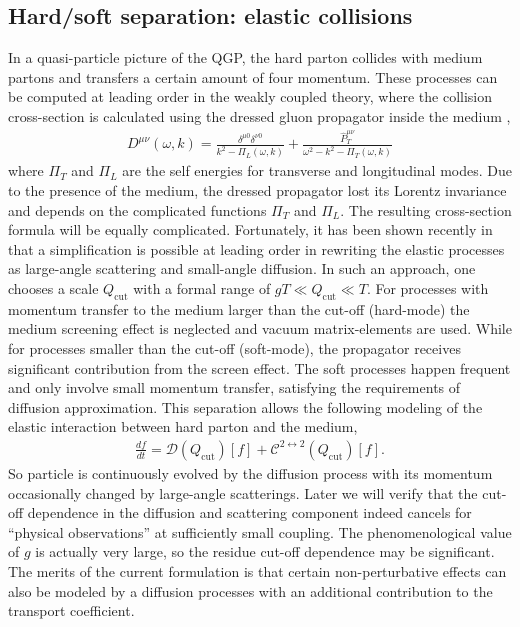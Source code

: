 \subsection{Hard/soft separation: elastic collisions}
In a quasi-particle picture of the QGP, the hard parton collides with medium partons and transfers a certain amount of four momentum.
These processes can be computed at leading order in the weakly coupled theory, where the collision cross-section is calculated using the dressed gluon propagator inside the medium \cite{PhysRevD.44.1298},
\begin{eqnarray}
D^{\mu\nu}(\omega, k) = \frac{\delta^{\mu 0}\delta^{\nu 0}}{k^2 - \Pi_L(\omega, k)} + \frac{\hat{P}_T^{\mu\nu}}{\omega^2 - k^2 - \Pi_T(\omega, k)}
\end{eqnarray}
where $\Pi_T$ and $\Pi_L$ are the self energies for transverse and longitudinal modes.
Due to the presence of the medium, the dressed propagator lost its Lorentz invariance and depends on the complicated functions $\Pi_T$ and $\Pi_L$.
The resulting cross-section formula will be equally complicated.
Fortunately, it has been shown recently in \cite{Ghiglieri:2015ala} that a simplification is possible at leading order in rewriting the elastic processes as large-angle scattering and small-angle diffusion.
In such an approach, one chooses a scale $Q_\textrm{cut}$ with a formal range of $gT \ll Q_\textrm{cut} \ll T$.
For processes with momentum transfer to the medium larger than the cut-off  (hard-mode) the medium screening effect is neglected and vacuum matrix-elements are used.
While for processes smaller than the cut-off (soft-mode), the propagator receives significant contribution from the screen effect.
The soft processes happen frequent and only involve small momentum transfer, satisfying the requirements of diffusion approximation.
This separation allows the following modeling of the elastic interaction between hard parton and the medium,
\begin{eqnarray}
\frac{df}{dt} = \mathcal{D}(Q_{\textrm{cut}})[f] + \mathcal{C}^{2\leftrightarrow 2}(Q_{\textrm{cut}})[f].
\end{eqnarray}
So particle is continuously evolved by the diffusion process with its momentum occasionally changed by large-angle scatterings.
Later we will verify that the cut-off dependence in the diffusion and scattering component indeed cancels for ``physical observations'' at sufficiently small coupling.
The phenomenological value of $g$ is actually very large, so the residue cut-off dependence may be significant. 
The merits of the current formulation is that certain  non-perturbative effects can also be modeled by a diffusion processes with an additional contribution to the transport coefficient.

